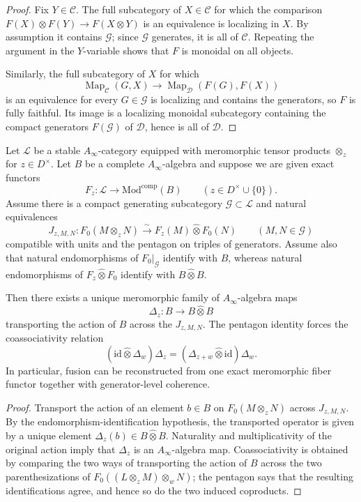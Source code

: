 \begin{proof}
Fix $Y\in\mathcal{C}$.  The full subcategory of $X\in\mathcal{C}$ for which the
comparison $F(X)\otimes F(Y)\to F(X\otimes Y)$ is an equivalence is localizing
in $X$.  By assumption it contains $\mathcal{G}$; since $\mathcal{G}$ generates,
it is all of $\mathcal{C}$.  Repeating the argument in the $Y$-variable shows
that $F$ is monoidal on all objects.

Similarly, the full subcategory of $X$ for which
\[
\operatorname{Map}_{\mathcal{C}}(G,X)
\longrightarrow
\operatorname{Map}_{\mathcal{D}}(F(G),F(X))
\]
is an equivalence for every $G\in\mathcal{G}$ is localizing and contains the
generators, so $F$ is fully faithful.  Its image is a localizing monoidal
subcategory containing the compact generators $F(\mathcal{G})$ of
$\mathcal{D}$, hence is all of $\mathcal{D}$.
\end{proof}

\begin{theorem}
\label{thm:meromorphic-tannakian-reconstruction}
Let $\mathcal{L}$ be a stable $A_\infty$-category equipped with meromorphic
tensor products $\otimes_z$ for $z\in D^\times$.  Let $B$ be a complete
$A_\infty$-algebra and suppose we are given exact functors
\[
F_z\colon \mathcal{L}\to \mathrm{Mod}^{\mathrm{comp}}(B)
\qquad (z\in D^\times\cup\{0\}).
\]
Assume there is a compact generating subcategory $\mathcal{G}\subset\mathcal{L}$
and natural equivalences
\[
J_{z,M,N}\colon F_0(M\otimes_zN)
\xrightarrow{\sim}
F_z(M)\widehat{\otimes}F_0(N)
\qquad (M,N\in\mathcal{G})
\]
compatible with units and the pentagon on triples of generators.  Assume also
that natural endomorphisms of $F_0|_{\mathcal{G}}$ identify with $B$, whereas
natural endomorphisms of $F_z\widehat{\otimes}F_0$ identify with
$B\widehat{\otimes}B$.

Then there exists a unique meromorphic family of $A_\infty$-algebra maps
\[
\Delta_z\colon B\to B\widehat{\otimes}B
\]
transporting the action of $B$ across the $J_{z,M,N}$.  The pentagon identity
forces the coassociativity relation
\[
(\mathrm{id}\widehat{\otimes}\Delta_w)\Delta_z
=
(\Delta_{z+w}\widehat{\otimes}\mathrm{id})\Delta_w.
\]
In particular, fusion can be reconstructed from one exact meromorphic fiber
functor together with generator-level coherence.
\end{theorem}

\begin{proof}
Transport the action of an element $b\in B$ on $F_0(M\otimes_zN)$ across
$J_{z,M,N}$.  By the endomorphism-identification hypothesis, the transported
operator is given by a unique element $\Delta_z(b)\in B\widehat{\otimes}B$.
Naturality and multiplicativity of the original action imply that $\Delta_z$ is
an $A_\infty$-algebra map.  Coassociativity is obtained by comparing the two
ways of transporting the action of $B$ across the two parenthesizations of
$F_0((L\otimes_zM)\otimes_wN)$; the pentagon says that the resulting
identifications agree, and hence so do the two induced coproducts.
\end{proof}

